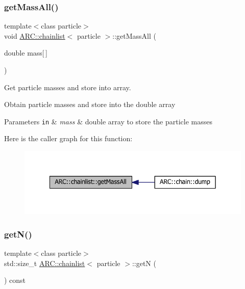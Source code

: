\subsubsection{\texorpdfstring{get\+Mass\+All()}{getMassAll()}}
{\footnotesize\ttfamily template$<$class particle$>$ \\
void \hyperlink{classARC_1_1chainlist}{A\+R\+C\+::chainlist}$<$ particle $>$\+::get\+Mass\+All (\begin{DoxyParamCaption}\item[{double}]{mass\mbox{[}$\,$\mbox{]} }\end{DoxyParamCaption})\hspace{0.3cm}{\ttfamily [inline]}}



Get particle masses and store into array. 

Obtain particle masses and store into the double array 
\begin{DoxyParams}[1]{Parameters}
\mbox{\tt in}  & {\em mass} & double array to store the particle masses \\
\hline
\end{DoxyParams}
Here is the caller graph for this function\+:
\nopagebreak
\begin{figure}[H]
\begin{center}
\leavevmode
\includegraphics[width=342pt]{classARC_1_1chainlist_a5cf42b57b7088cf7418ae3d9f1b610fa_icgraph}
\end{center}
\end{figure}
\hypertarget{classARC_1_1chainlist_a9b45780f42626b14e3a2fd7b5de4bf32}{}\label{classARC_1_1chainlist_a9b45780f42626b14e3a2fd7b5de4bf32} 
\subsubsection{\texorpdfstring{get\+N()}{getN()}}
{\footnotesize\ttfamily template$<$class particle$>$ \\
std\+::size\+\_\+t \hyperlink{classARC_1_1chainlist}{A\+R\+C\+::chainlist}$<$ particle $>$\+::getN (\begin{DoxyParamCaption}{ }\end{DoxyParamCaption}) const\hspace{0.3cm}{\ttfamily [inline]}}



